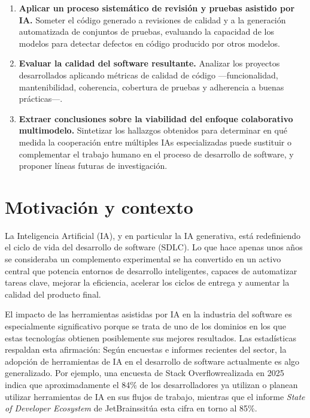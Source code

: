 \begin{enumerate}
  \item \textbf{Aplicar un proceso sistemático de revisión y pruebas asistido por IA.} Someter el código generado a revisiones de calidad y a la generación automatizada de conjuntos de pruebas, evaluando la capacidad de los modelos para detectar defectos en código producido por otros modelos.

  \item \textbf{Evaluar la calidad del software resultante.} Analizar los proyectos desarrollados aplicando métricas de calidad de código ---funcionalidad, mantenibilidad, coherencia, cobertura de pruebas y adherencia a buenas prácticas---.

  \item \textbf{Extraer conclusiones sobre la viabilidad del enfoque colaborativo multimodelo.} Sintetizar los hallazgos obtenidos para determinar en qué medida la cooperación entre múltiples IAs especializadas puede sustituir o complementar el trabajo humano en el proceso de desarrollo de software, y proponer líneas futuras de investigación.
\end{enumerate}

\section{Motivación y contexto} \label{sec:motivacion}

La Inteligencia Artificial (\ac{IA}), y en particular la \ac{IA} generativa, está redefiniendo el ciclo de vida del desarrollo de software (\ac{SDLC}). Lo que hace apenas unos años se consideraba un complemento experimental se ha convertido en un activo central que potencia entornos de desarrollo inteligentes, capaces de automatizar tareas clave, mejorar la eficiencia, acelerar los ciclos de entrega y aumentar la calidad del producto final.

El impacto de las herramientas asistidas por \ac{IA} en la industria del software es especialmente significativo porque se trata de uno de los dominios en los que estas tecnologías obtienen posiblemente sus mejores resultados. Las estadísticas respaldan esta afirmación: Según encuestas e informes recientes del sector\footnotemark[1] \footnotemark[2], la adopción de herramientas de \ac{IA} en el desarrollo de software actualmente es algo generalizado. Por ejemplo, una encuesta de Stack Overflow\footnotemark[1] realizada en 2025 indica que aproximadamente el 84\% de los desarrolladores ya utilizan o planean utilizar herramientas de \ac{IA} en sus flujos de trabajo, mientras que el informe \textit{State of Developer Ecosystem} de JetBrains\footnotemark[2] sitúa esta cifra en torno al 85\%.

